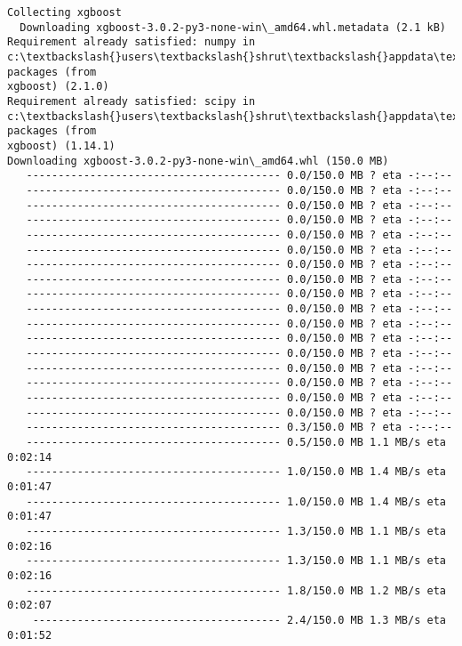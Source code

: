 \documentclass[11pt]{article}
\begin{document}
    \begin{Verbatim}[commandchars=\\\{\}]
Collecting xgboost
  Downloading xgboost-3.0.2-py3-none-win\_amd64.whl.metadata (2.1 kB)
Requirement already satisfied: numpy in
c:\textbackslash{}users\textbackslash{}shrut\textbackslash{}appdata\textbackslash{}local\textbackslash{}programs\textbackslash{}python\textbackslash{}python312\textbackslash{}lib\textbackslash{}site-packages (from
xgboost) (2.1.0)
Requirement already satisfied: scipy in
c:\textbackslash{}users\textbackslash{}shrut\textbackslash{}appdata\textbackslash{}local\textbackslash{}programs\textbackslash{}python\textbackslash{}python312\textbackslash{}lib\textbackslash{}site-packages (from
xgboost) (1.14.1)
Downloading xgboost-3.0.2-py3-none-win\_amd64.whl (150.0 MB)
   ---------------------------------------- 0.0/150.0 MB ? eta -:--:--
   ---------------------------------------- 0.0/150.0 MB ? eta -:--:--
   ---------------------------------------- 0.0/150.0 MB ? eta -:--:--
   ---------------------------------------- 0.0/150.0 MB ? eta -:--:--
   ---------------------------------------- 0.0/150.0 MB ? eta -:--:--
   ---------------------------------------- 0.0/150.0 MB ? eta -:--:--
   ---------------------------------------- 0.0/150.0 MB ? eta -:--:--
   ---------------------------------------- 0.0/150.0 MB ? eta -:--:--
   ---------------------------------------- 0.0/150.0 MB ? eta -:--:--
   ---------------------------------------- 0.0/150.0 MB ? eta -:--:--
   ---------------------------------------- 0.0/150.0 MB ? eta -:--:--
   ---------------------------------------- 0.0/150.0 MB ? eta -:--:--
   ---------------------------------------- 0.0/150.0 MB ? eta -:--:--
   ---------------------------------------- 0.0/150.0 MB ? eta -:--:--
   ---------------------------------------- 0.0/150.0 MB ? eta -:--:--
   ---------------------------------------- 0.0/150.0 MB ? eta -:--:--
   ---------------------------------------- 0.0/150.0 MB ? eta -:--:--
   ---------------------------------------- 0.3/150.0 MB ? eta -:--:--
   ---------------------------------------- 0.5/150.0 MB 1.1 MB/s eta 0:02:14
   ---------------------------------------- 1.0/150.0 MB 1.4 MB/s eta 0:01:47
   ---------------------------------------- 1.0/150.0 MB 1.4 MB/s eta 0:01:47
   ---------------------------------------- 1.3/150.0 MB 1.1 MB/s eta 0:02:16
   ---------------------------------------- 1.3/150.0 MB 1.1 MB/s eta 0:02:16
   ---------------------------------------- 1.8/150.0 MB 1.2 MB/s eta 0:02:07
    --------------------------------------- 2.4/150.0 MB 1.3 MB/s eta 0:01:52

\end{Verbatim}
\end{document}
